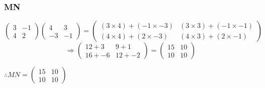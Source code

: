 \documentclass{article}
\begin{document}
\subsubsection{MN}
\[
	\begin{pmatrix}
		3 & -1\\
		4 & 2
	\end{pmatrix}
	\begin{pmatrix}
		4 & 3\\
		-3 & -1
	\end{pmatrix}
	=
	\begin{pmatrix}
		(3\times4)+(-1\times-3) & (3\times3)+(-1\times-1)\\
		(4\times4)+(2\times-3) & (4\times3)+(2\times-1)
	\end{pmatrix}
\]
\[
	\Rightarrow
	\begin{pmatrix}
		12+3 & 9+1\\
		16+-6 & 12+-2
	\end{pmatrix}
	= 
	\begin{pmatrix}
		15 & 10\\
		10 & 10
	\end{pmatrix}
\]
\begin{center}\vspace{0.5cm}$\therefore MN=\begin{pmatrix} 15 & 10\\ 10 & 10\end{pmatrix}$\end{center}
\end{document}
